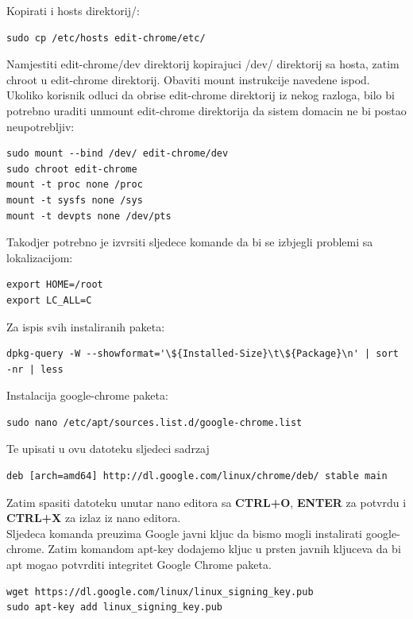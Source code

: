 \documentclass[12pt,vi]{mitthesis}
\begin{document}
\noindent
Kopirati i hosts direktorij/:
\begin{lstlisting}[style=BashInputStyle]
sudo cp /etc/hosts edit-chrome/etc/
\end{lstlisting}

\noindent
Namjestiti edit-chrome/dev direktorij kopirajuci /dev/ direktorij sa hosta, zatim chroot u edit-chrome direktorij.
Obaviti mount instrukcije navedene ispod. Ukoliko korisnik odluci da obrise edit-chrome direktorij iz nekog razloga,
bilo bi potrebno uraditi unmount edit-chrome direktorija da sistem domacin ne bi postao neupotrebljiv:
\begin{lstlisting}[style=BashInputStyle]
sudo mount --bind /dev/ edit-chrome/dev
sudo chroot edit-chrome
mount -t proc none /proc
mount -t sysfs none /sys
mount -t devpts none /dev/pts
\end{lstlisting}

\noindent
Takodjer potrebno je izvrsiti sljedece komande da bi se izbjegli problemi sa lokalizacijom:
\begin{lstlisting}[style=BashInputStyle]
export HOME=/root
export LC_ALL=C
\end{lstlisting}

\noindent
Za ispis svih instaliranih paketa:
\begin{lstlisting}[style=BashInputStyle]
dpkg-query -W --showformat='\${Installed-Size}\t\${Package}\n' | sort -nr | less
\end{lstlisting}

\noindent
Instalacija google-chrome paketa:
\begin{lstlisting}[style=BashInputStyle]
sudo nano /etc/apt/sources.list.d/google-chrome.list
\end{lstlisting}
Te upisati u ovu datoteku sljedeci sadrzaj
\begin{lstlisting}[style=BashInputStyle]
deb [arch=amd64] http://dl.google.com/linux/chrome/deb/ stable main
\end{lstlisting}
Zatim spasiti datoteku unutar nano editora sa \textbf{CTRL+O}, \textbf{ENTER} za potvrdu i \textbf{CTRL+X} za izlaz iz nano editora.\\
Sljedeca komanda preuzima Google javni kljuc da bismo mogli instalirati google-chrome. Zatim komandom apt-key dodajemo kljuc u prsten javnih kljuceva da bi apt mogao potvrditi integritet Google Chrome paketa.\\
\begin{lstlisting}[style=BashInputStyle]
wget https://dl.google.com/linux/linux_signing_key.pub
sudo apt-key add linux_signing_key.pub
\end{lstlisting}
\end{document}
